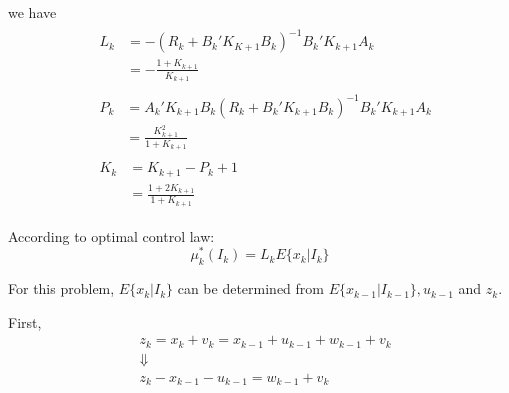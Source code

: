 \documentclass{article}
\begin{document}
    we have
    \begin{equation*}
        \begin{aligned}
            &\begin{split}
                L_k &=-(R_k+B_k'K_{K+1}B_k)^{-1}B_k'K_{k+1}A_k\\
                    &=-\frac{1+K_{k+1}}{K_{k+1}}
            \end{split}
            \\
            & \begin{split}
                P_k&=A_k'K_{k+1}B_k(R_k+B_k'K_{k+1}B_k)^{-1}B_k'K_{k+1}A_k\\
                &=\frac{K_{k+1}^2}{1+K_{k+1}}
            \end{split}\\
            &\begin{split}
                K_k&=K_{k+1}-P_k+1\\
                &=\frac{1+2K_{k+1}}{1+K_{k+1}}
            \end{split}
        \end{aligned}
    \end{equation*}

    According to optimal control law:
    \begin{equation*}
        \mu_k^*(I_k)=L_kE\{x_k|I_k\}
    \end{equation*}

    For this problem, $E\{x_k|I_k\}$ can be determined from $E\{x_{k-1}|I_{k-1}\},u_{k-1}$ and $z_k$. 

    First,
    \begin{equation*}
        \begin{aligned}
            &z_k = x_k+v_k=x_{k-1}+u_{k-1}+w_{k-1}+v_k\\
            &\Downarrow\\
            &z_k-x_{k-1}-u_{k-1}=w_{k-1}+v_k
        \end{aligned}
    \end{equation*}
\end{document}
